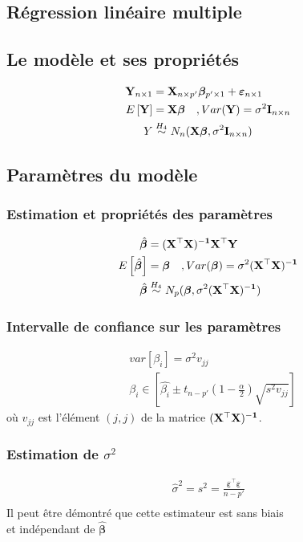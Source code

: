 \documentclass[10pt, french]{article}
\begin{document}
\begin{multicols*}{3}
\section{Régression linéaire multiple}
\subsection*{Le modèle et ses propriétés}
\begin{align*}
\mathbf{Y}_{n \times 1} & = \mathbf{X}_{n \times p'} \bm{\beta}_{p' \times 1} + \bm{\varepsilon}_{n \times 1} \\
E \left[ \mathbf{Y} \right]	& = \mathbf{X} \bm{\beta} \quad , Var(\mathbf{Y}) = \sigma^2 \mathbf{I}_{n \times n} \\
Y & \overset{H_4}{\sim} N_n(\mathbf{X} \bm{\beta}, \sigma^2 \mathbf{I}_{n \times n}) \\
\end{align*}

\subsection*{Paramètres du modèle}
\subsubsection*{Estimation et propriétés des paramètres}
\begin{align*}
\hat{\bm{\beta}} & = \mathbf{(X^\top X)^{-1} X^\top Y} \\
E \left[ \hat{\bm{\beta}} \right]	& = \bm{\beta} \quad , Var(\bm{\beta}) = \sigma^2 (\mathbf{X^\top X)^{-1}} \\
\hat{\bm{\beta}} & \overset{H_4}{\sim} N_p(\bm{\beta}, \sigma^2 (\mathbf{X^\top X)^{-1}})
\end{align*}

\subsubsection*{Intervalle de confiance sur les paramètres}
\begin{align*}
&var[\beta_i] = \sigma^2 v_{jj} \\
&\beta_i \in \left[ \hat{\beta_i} \pm t_{n-p'}(1- \frac{\alpha}{2}) \sqrt{s^2 v_{jj}} \right]
\end{align*}
où $v_{jj}$ est l'élément $(j,j)$ de la matrice $\mathbf{(X^\top X)^{-1}}$.

\subsubsection*{Estimation de $\sigma^2$}
\begin{align*}
\hat{\sigma}^2 = s^2 = \frac{\hat{\bm{\varepsilon}}^\top \hat{\bm{\varepsilon}}}{n-p'} \\
\end{align*}
Il peut être démontré que cette estimateur est sans biais \\
et indépendant de $\bm{\hat{\beta}}$


\end{multicols*}
\end{document}
